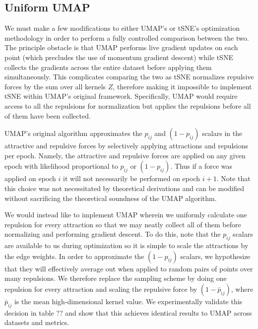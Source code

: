 \documentclass{article}
\theoremstyle{definition}
\begin{document}
\subsection{Uniform UMAP} \label{uniform}
We must make a few modifications to either UMAP's or tSNE's optimization methodology in order to perform a fully controlled comparison between the two. The principle obstacle is that
UMAP performs live gradient updates on each point (which precludes the use of momentum gradient descent) while tSNE collects the gradients across the entire
dataset before applying them simultaneously. This complicates comparing the two as tSNE normalizes repulsive forces by the sum over all kernels $Z$,
therefore making it impossible to implement tSNE within UMAP's original framework. Specifically, UMAP would require access to all the repulsions for
normalization but applies the repulsions before all of them have been collected.

UMAP's original algorithm approximates the $p_{ij}$ and $(1 - p_{ij})$ scalars in the attractive and repulsive forces by selectively applying attractions
and repulsions per epoch. Namely, the attractive and repulsive forces are applied on any given epoch with likelihood proportional to $p_{ij}$
or $(1 - p_{ij})$. Thus if a force was applied on epoch $i$ it will not necessarily be performed on epoch $i+1$. Note that this choice was not necessitated by theoretical derivations
and can be modified without sacrificing the theoretical soundness of the UMAP algorithm.

We would instead like to implement UMAP wherein we uniformly calculate one repulsion for every attraction so that we may neatly collect all of them before normalizing and performing gradient descent. To do this, note that the $p_{ij}$ scalars are available to us during
optimization so it is simple to scale the attractions by the edge weights. In order to approximate the $(1 - p_{ij})$ scalars, we hypothesize that they will
effectively average out when applied to random pairs of points over many repulsions. We therefore replace the sampling scheme by doing one repulsion for every attraction and scaling the repulsive force by $(1 - \bar{p}_{ij})$, where
$\bar{p}_{ij}$ is the mean high-dimensional kernel value. We experimentally validate this decision in table ?? and show that this achieves identical results to UMAP across datasets and metrics.
\end{document}
